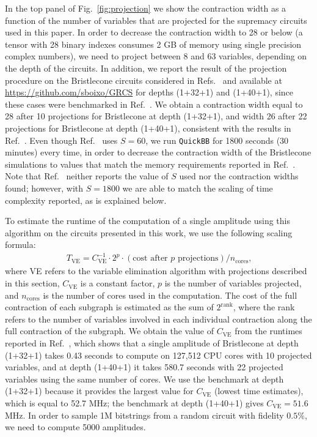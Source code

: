 In the top panel of Fig.~\ref{fig:projection} we show the contraction width as a function of the number of variables that are projected for the supremacy circuits used in this paper. In order to decrease the contraction width to 28 or below (a tensor with 28 binary indexes consumes 2 GB of memory using single precision complex numbers), we need to project between 8 and 63 variables, depending on the depth of the circuits. In addition, we report the result of the projection procedure on the Bristlecone circuits considered in Refs.~\cite{villalonga2019flexible,zhang2019alibaba} and available at \url{https://github.com/sboixo/GRCS} for depths (1+32+1) and (1+40+1), since these cases were benchmarked in Ref.~\cite{zhang2019alibaba}. We obtain a contraction width equal to 28 after 10 projections for Bristlecone at depth (1+32+1), and width 26 after 22 projections for Bristlecone at depth (1+40+1), consistent with the results in  Ref.~\cite{zhang2019alibaba}. Even though Ref.~\cite{chen2018classical} uses $S=60$, we run {\tt QuickBB} for 1800 seconds (30 minutes) every time, in order to decrease the contraction width of the Bristlecone simulations to values that match the memory requirements reported in Ref.~\cite{zhang2019alibaba}. Note that Ref.~\cite{zhang2019alibaba} neither reports the value of $S$ used nor the contraction widths found; however, with $S=1800$ we are able to match the scaling of time complexity reported, as is explained below.

To estimate the runtime of the computation of a single amplitude using this algorithm on the circuits presented in this work, we use the following scaling formula:
\begin{align}
    T_{\text{VE}} = C_{\text{VE}}^{-1} \cdot 2^p \cdot (\text{cost after } p \text{ projections}) / n_{\text{cores}}\text{,}
\end{align}
where VE refers to the variable elimination algorithm with projections described in this section, $C_{\text{VE}}$ is a constant factor, $p$ is the number of variables projected, and $n_{\text{cores}}$ is the number of cores used in the computation. The cost of the full contraction of each subgraph is estimated as the sum of $2^\text{rank}$, where the rank refers to the number of variables involved in each individual contraction along the full contraction of the subgraph. We obtain the value of $C_{\text{VE}}$ from the runtimes reported in Ref.~\cite{chen2018classical}, which shows that a single amplitude of Bristlecone at depth (1+32+1) takes 0.43 seconds to compute on 127,512 CPU cores with 10 projected variables, and at depth (1+40+1) it takes 580.7 seconds with 22 projected variables using the same number of cores. We use the benchmark at depth (1+32+1) because it provides the largest value for $C_{\text{VE}}$ (lowest time estimates), which is equal to 52.7 MHz; the benchmark at depth (1+40+1) gives $C_{\text{VE}} = 51.6$ MHz. In order to sample 1M bitstrings from a random circuit with fidelity $0.5\%$, we need to compute 5000 amplitudes. 

